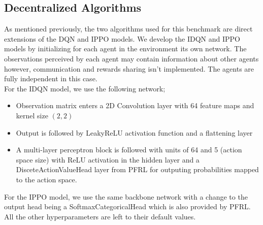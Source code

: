 \documentclass[conference]{IEEEtran}
\begin{document}
\subsection{Decentralized Algorithms}
As mentioned previously, the two algorithms used for this benchmark are direct extensions of the DQN and IPPO models. We develop the IDQN and IPPO
models by initializing for each agent in the environment its own network. The observations perceived by each agent may contain information about other agents
however, communication and rewards sharing isn't implemented. The agents are fully independent in this case.\\
For the IDQN model, we use the following network;
\begin{itemize}
    \item Observation matrix enters a 2D Convolution layer with 64 feature maps and kernel size $(2, 2)$
    \item Output is followed by LeakyReLU activation function and a flattening layer
    \item A multi-layer perceptron block is followed with units of 64 and 5 (action space size) with ReLU activation in the hidden layer and a DisceteActionValueHead layer from PFRL for outputing probabilities mapped to the action space.
\end{itemize}

For the IPPO model, we use the same backbone network with a change to the output head being a SoftmaxCategoricalHead which is also provided by PFRL.
All the other hyperparameters are left to their default values.
\end{document}
